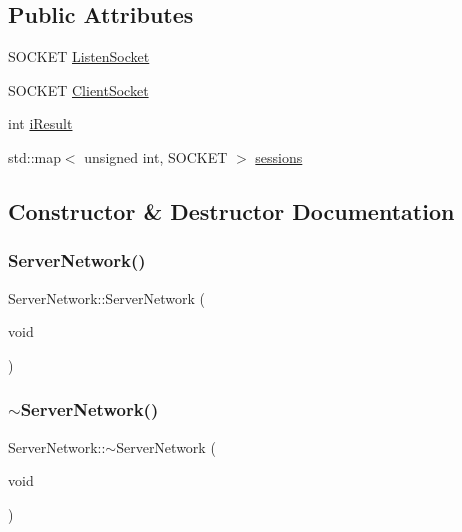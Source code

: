 \subsection*{Public Attributes}
\begin{DoxyCompactItemize}
\item 
S\+O\+C\+K\+ET \mbox{\hyperlink{class_server_network_a903089768bbbfa891774eaaaf8ce79b7}{Listen\+Socket}}
\item 
S\+O\+C\+K\+ET \mbox{\hyperlink{class_server_network_a432ddc13be160e45b4e1f61a117213d3}{Client\+Socket}}
\item 
int \mbox{\hyperlink{class_server_network_ad90cce9fc9f5945db77450548c0e0f63}{i\+Result}}
\item 
std\+::map$<$ unsigned int, S\+O\+C\+K\+ET $>$ \mbox{\hyperlink{class_server_network_a3acc0dabb1f7264874843ebd896a6d20}{sessions}}
\end{DoxyCompactItemize}


\subsection{Constructor \& Destructor Documentation}
\mbox{\label{class_server_network_ae5ef6aa3aa8c12d9e72a36873bf0f92a}} 
\subsubsection{\texorpdfstring{Server\+Network()}{ServerNetwork()}}
{\footnotesize\ttfamily Server\+Network\+::\+Server\+Network (\begin{DoxyParamCaption}\item[{void}]{ }\end{DoxyParamCaption})}

\mbox{\label{class_server_network_a105ccb70cf8cd161dc01076fe72e6cfe}} 
\subsubsection{\texorpdfstring{$\sim$\+Server\+Network()}{~ServerNetwork()}}
{\footnotesize\ttfamily Server\+Network\+::$\sim$\+Server\+Network (\begin{DoxyParamCaption}\item[{void}]{ }\end{DoxyParamCaption})}



